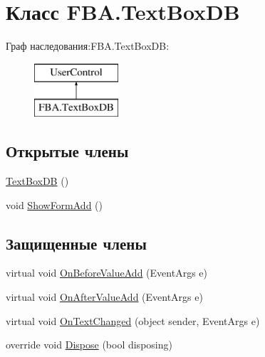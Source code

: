 \hypertarget{class_f_b_a_1_1_text_box_d_b}{}\section{Класс F\+B\+A.\+Text\+Box\+DB}
\label{class_f_b_a_1_1_text_box_d_b}
Граф наследования\+:F\+B\+A.\+Text\+Box\+DB\+:\begin{figure}[H]
\begin{center}
\leavevmode
\includegraphics[height=2.000000cm]{class_f_b_a_1_1_text_box_d_b}
\end{center}
\end{figure}
\subsection*{Открытые члены}
\begin{DoxyCompactItemize}
\item 
\mbox{\hyperlink{class_f_b_a_1_1_text_box_d_b_aaf85dfd79ead0d3aeded91bfe33f8b9b}{Text\+Box\+DB}} ()
\item 
void \mbox{\hyperlink{class_f_b_a_1_1_text_box_d_b_afbd92c18560370a01250d596d37f8aea}{Show\+Form\+Add}} ()
\end{DoxyCompactItemize}
\subsection*{Защищенные члены}
\begin{DoxyCompactItemize}
\item 
virtual void \mbox{\hyperlink{class_f_b_a_1_1_text_box_d_b_ae0ff9092123f6a808a15984e54c4aea4}{On\+Before\+Value\+Add}} (Event\+Args e)
\item 
virtual void \mbox{\hyperlink{class_f_b_a_1_1_text_box_d_b_a759789e1548e0cffda50a69d395745b1}{On\+After\+Value\+Add}} (Event\+Args e)
\item 
virtual void \mbox{\hyperlink{class_f_b_a_1_1_text_box_d_b_aeeb08dc00b18e180dd0f93161d1992df}{On\+Text\+Changed}} (object sender, Event\+Args e)
\item 
override void \mbox{\hyperlink{class_f_b_a_1_1_text_box_d_b_a273d86eb643cda88314258d67bada53e}{Dispose}} (bool disposing)
\end{DoxyCompactItemize}
